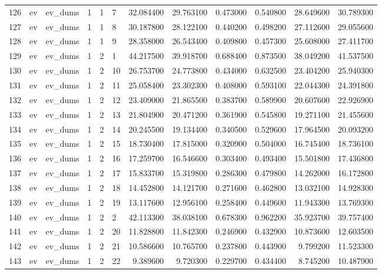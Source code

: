 \begin{tabular}{llllllrrrrrr}
126 & ev & ev_dums & 1 & 1 & 7 & 32.084400 & 29.763100 & 0.473000 & 0.540800 & 28.649600 & 30.789300 \\
127 & ev & ev_dums & 1 & 1 & 8 & 30.187800 & 28.122100 & 0.440200 & 0.498200 & 27.112600 & 29.055600 \\
128 & ev & ev_dums & 1 & 1 & 9 & 28.358000 & 26.543400 & 0.409800 & 0.457300 & 25.608000 & 27.411700 \\
129 & ev & ev_dums & 1 & 2 & 1 & 44.217500 & 39.918700 & 0.688400 & 0.873500 & 38.049200 & 41.537500 \\
130 & ev & ev_dums & 1 & 2 & 10 & 26.753700 & 24.773800 & 0.434000 & 0.632500 & 23.404200 & 25.940300 \\
131 & ev & ev_dums & 1 & 2 & 11 & 25.058400 & 23.302300 & 0.408000 & 0.593100 & 22.044300 & 24.391800 \\
132 & ev & ev_dums & 1 & 2 & 12 & 23.409000 & 21.865500 & 0.383700 & 0.589900 & 20.607600 & 22.926900 \\
133 & ev & ev_dums & 1 & 2 & 13 & 21.804900 & 20.471200 & 0.361900 & 0.545800 & 19.271100 & 21.455600 \\
134 & ev & ev_dums & 1 & 2 & 14 & 20.245500 & 19.134400 & 0.340500 & 0.529600 & 17.964500 & 20.093200 \\
135 & ev & ev_dums & 1 & 2 & 15 & 18.730400 & 17.815000 & 0.320900 & 0.504000 & 16.745400 & 18.736100 \\
136 & ev & ev_dums & 1 & 2 & 16 & 17.259700 & 16.546600 & 0.303400 & 0.493400 & 15.501800 & 17.436800 \\
137 & ev & ev_dums & 1 & 2 & 17 & 15.833700 & 15.319800 & 0.286300 & 0.479800 & 14.262000 & 16.172800 \\
138 & ev & ev_dums & 1 & 2 & 18 & 14.452800 & 14.121700 & 0.271600 & 0.462800 & 13.032100 & 14.928300 \\
139 & ev & ev_dums & 1 & 2 & 19 & 13.117600 & 12.956100 & 0.258400 & 0.449600 & 11.943300 & 13.769300 \\
140 & ev & ev_dums & 1 & 2 & 2 & 42.113300 & 38.038100 & 0.678300 & 0.962200 & 35.923700 & 39.757400 \\
141 & ev & ev_dums & 1 & 2 & 20 & 11.828800 & 11.842300 & 0.246900 & 0.432900 & 10.873600 & 12.603500 \\
142 & ev & ev_dums & 1 & 2 & 21 & 10.586600 & 10.765700 & 0.237800 & 0.443900 & 9.799200 & 11.523300 \\
143 & ev & ev_dums & 1 & 2 & 22 & 9.389600 & 9.720300 & 0.229700 & 0.434400 & 8.745200 & 10.487900 \\

\end{tabular}
